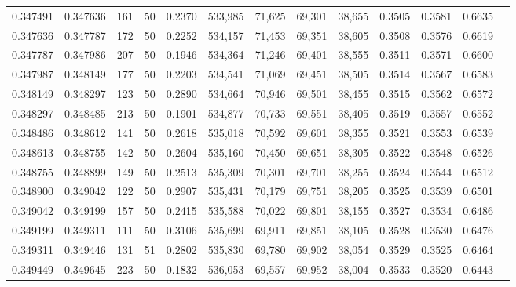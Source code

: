 \begin{tabular}{rrrrrrrrrrrrr}
0.347491 & 0.347636 &   161 &  50 &                                     0.2370 & 533,985 &  71,625 &  69,301 &  38,655 & 0.3505 & 0.3581 & 0.6635 \\
0.347636 & 0.347787 &   172 &  50 &                                     0.2252 & 534,157 &  71,453 &  69,351 &  38,605 & 0.3508 & 0.3576 & 0.6619 \\
0.347787 & 0.347986 &   207 &  50 &                                     0.1946 & 534,364 &  71,246 &  69,401 &  38,555 & 0.3511 & 0.3571 & 0.6600 \\
0.347987 & 0.348149 &   177 &  50 &                                     0.2203 & 534,541 &  71,069 &  69,451 &  38,505 & 0.3514 & 0.3567 & 0.6583 \\
0.348149 & 0.348297 &   123 &  50 &                                     0.2890 & 534,664 &  70,946 &  69,501 &  38,455 & 0.3515 & 0.3562 & 0.6572 \\
0.348297 & 0.348485 &   213 &  50 &                                     0.1901 & 534,877 &  70,733 &  69,551 &  38,405 & 0.3519 & 0.3557 & 0.6552 \\
0.348486 & 0.348612 &   141 &  50 &                                     0.2618 & 535,018 &  70,592 &  69,601 &  38,355 & 0.3521 & 0.3553 & 0.6539 \\
0.348613 & 0.348755 &   142 &  50 &                                     0.2604 & 535,160 &  70,450 &  69,651 &  38,305 & 0.3522 & 0.3548 & 0.6526 \\
0.348755 & 0.348899 &   149 &  50 &                                     0.2513 & 535,309 &  70,301 &  69,701 &  38,255 & 0.3524 & 0.3544 & 0.6512 \\
0.348900 & 0.349042 &   122 &  50 &                                     0.2907 & 535,431 &  70,179 &  69,751 &  38,205 & 0.3525 & 0.3539 & 0.6501 \\
0.349042 & 0.349199 &   157 &  50 &                                     0.2415 & 535,588 &  70,022 &  69,801 &  38,155 & 0.3527 & 0.3534 & 0.6486 \\
0.349199 & 0.349311 &   111 &  50 &                                     0.3106 & 535,699 &  69,911 &  69,851 &  38,105 & 0.3528 & 0.3530 & 0.6476 \\
0.349311 & 0.349446 &   131 &  51 &                                     0.2802 & 535,830 &  69,780 &  69,902 &  38,054 & 0.3529 & 0.3525 & 0.6464 \\
0.349449 & 0.349645 &   223 &  50 &                                     0.1832 & 536,053 &  69,557 &  69,952 &  38,004 & 0.3533 & 0.3520 & 0.6443 \\

\end{tabular}
